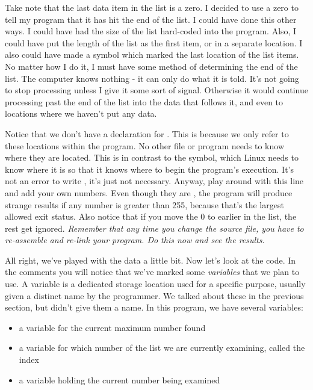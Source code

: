 Take note that the last data item in the list is a zero.  I decided 
to use a zero to tell my program that
it has hit the end of the list.  I could have done this other ways.  I
could have had the size of the list hard-coded into the program.  Also,
I could have put the length of the list as the first item, or in a separate
location.  I also could have made a symbol which marked the last location
of the list items.  No matter how I do it, I must have some method of 
determining the end of the list.  The computer knows nothing -
it can only do what it is told.  It's not going to stop processing unless I give
it some sort of signal.  Otherwise it would continue processing past the end
of the list into the data that follows it, and even to locations where 
we haven't put any data.

Notice that we don't have a 
 declaration for .
This is because we only refer to these locations within the program.  No
other file or program needs to know where they are located.  This is
in contrast to the  symbol, which Linux
needs to know where it is so that it knows where to begin
the program's execution.  It's not an error to write 
, it's just not necessary.
Anyway, play around with this line and add your own numbers.  Even
though they are , the program will produce
strange results if any number is greater than 255, because that's the
largest allowed 
exit status.  
Also notice that if you move the 0 to
earlier in the list, the rest get ignored.  
\emph{Remember that any time
you change the source file, you have to re-assemble and re-link
your program.  Do this now and see the results}.

All right, we've played with the data a little bit.  Now let's look
at the code.  In the comments you will notice that we've marked
some \emph{variables} 
that we plan to use.  A variable
is a dedicated storage location used for a specific purpose, usually
given a distinct name by the programmer.  We talked about these in the
previous section, but didn't give them a name.  In this program, we have 
several variables:

\begin{itemize}\item a variable for the current maximum number found 
\item a variable for which number of the list we are currently examining, called the index 
\item a variable holding the current number being examined 
\end{itemize}

